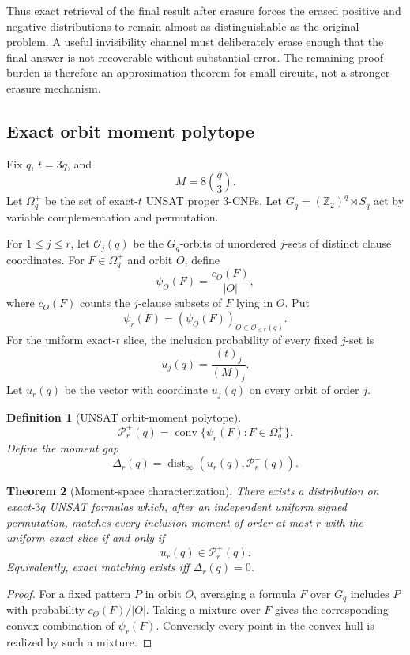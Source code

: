 \documentclass[11pt]{article}
\newtheorem{theorem}{Theorem}
\newtheorem{definition}[theorem]{Definition}
\begin{document}
Thus exact retrieval of the final result after erasure forces the erased positive and negative distributions to remain almost as distinguishable as the original problem. A useful invisibility channel must deliberately erase enough that the final answer is not recoverable without substantial error. The remaining proof burden is therefore an approximation theorem for small circuits, not a stronger erasure mechanism.

\subsection{Exact orbit moment polytope}
Fix $q$, $t=3q$, and
\[
M=8\binom q3.
\]
Let $\Omega_q^+$ be the set of exact-$t$ UNSAT proper 3-CNFs. Let $G_q=(\mathbb Z_2)^q\rtimes S_q$ act by variable complementation and permutation.

For $1\le j\le r$, let $\mathcal O_j(q)$ be the $G_q$-orbits of unordered $j$-sets of distinct clause coordinates. For $F\in\Omega_q^+$ and orbit $O$, define
\[
\psi_O(F)=\frac{c_O(F)}{|O|},
\]
where $c_O(F)$ counts the $j$-clause subsets of $F$ lying in $O$. Put
\[
\psi_r(F)=(\psi_O(F))_{O\in\mathcal O_{\le r}(q)}.
\]
For the uniform exact-$t$ slice, the inclusion probability of every fixed $j$-set is
\[
u_j(q)=\frac{(t)_j}{(M)_j}.
\]
Let $u_r(q)$ be the vector with coordinate $u_j(q)$ on every orbit of order $j$.

\begin{definition}[UNSAT orbit-moment polytope]
\[
\mathcal P_r^+(q)=\operatorname{conv}\{\psi_r(F):F\in\Omega_q^+\}.
\]
Define the moment gap
\[
\Delta_r(q)=\operatorname{dist}_\infty(u_r(q),\mathcal P_r^+(q)).
\]
\end{definition}

\begin{theorem}[Moment-space characterization]
There exists a distribution on exact-$3q$ UNSAT formulas which, after an independent uniform signed permutation, matches every inclusion moment of order at most $r$ with the uniform exact slice if and only if
\[
u_r(q)\in\mathcal P_r^+(q).
\]
Equivalently, exact matching exists iff $\Delta_r(q)=0$.
\end{theorem}
\begin{proof}
For a fixed pattern $P$ in orbit $O$, averaging a formula $F$ over $G_q$ includes $P$ with probability $c_O(F)/|O|$. Taking a mixture over $F$ gives the corresponding convex combination of $\psi_r(F)$. Conversely every point in the convex hull is realized by such a mixture.
\end{proof}
\end{document}
